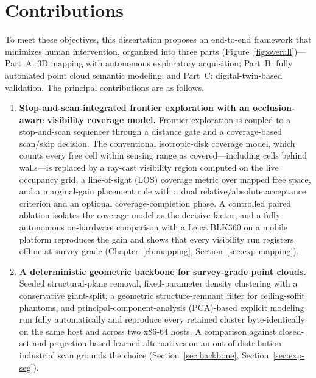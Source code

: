 \section{Contributions}
\label{sec:contributions}

To meet these objectives, this dissertation proposes an end-to-end framework
that minimizes human intervention, organized into three parts
(Figure~\ref{fig:overall})---Part~A: 3D mapping with autonomous exploratory
acquisition; Part~B: fully automated point cloud semantic modeling; and Part~C:
digital-twin-based validation. The principal contributions are as follows.

\begin{enumerate}[leftmargin=2.2em,itemsep=2pt]
  \item \textbf{Stop-and-scan-integrated frontier exploration with an
        occlusion-aware visibility coverage model.} Frontier exploration is
        coupled to a stop-and-scan sequencer through a distance gate and a
        coverage-based scan/skip decision. The conventional isotropic-disk
        coverage model, which counts every free cell within sensing range as
        covered---including cells behind walls---is replaced by a ray-cast
        visibility region computed on the live occupancy grid, a line-of-sight
        (LOS) coverage metric over mapped free space, and a marginal-gain
        placement rule with a dual relative/absolute acceptance criterion and
        an optional coverage-completion phase. A controlled paired ablation
        isolates the coverage model as the decisive factor, and a fully
        autonomous on-hardware comparison with a Leica BLK360 on a mobile
        platform reproduces the gain and shows that every visibility run
        registers offline at survey grade (Chapter~\ref{ch:mapping},
        Section~\ref{sec:exp-mapping}).
  \item \textbf{A deterministic geometric backbone for survey-grade point
        clouds.} Seeded structural-plane removal, fixed-parameter density
        clustering with a conservative giant-split, a geometric
        structure-remnant filter for ceiling-soffit phantoms, and
        principal-component-analysis (PCA)-based explicit modeling run fully
        automatically and reproduce every retained
        cluster byte-identically on the same host and across two x86-64 hosts.
        A comparison against closed-set and projection-based learned
        alternatives on an out-of-distribution industrial scan grounds the
        choice (Section~\ref{sec:backbone}, Section~\ref{sec:exp-seg}).

\end{enumerate}
